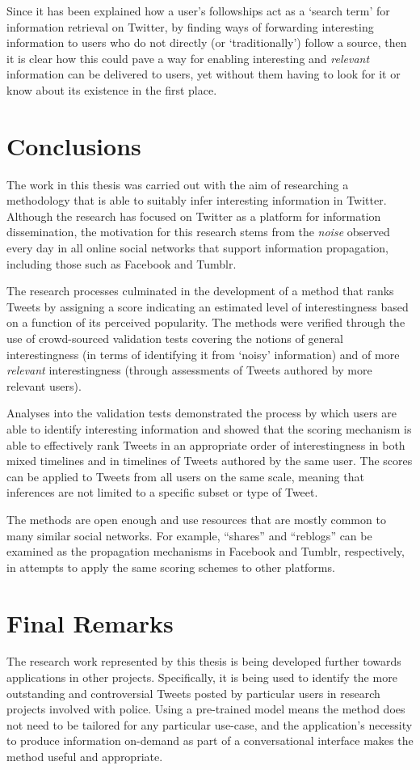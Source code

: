 Since it has been explained how a user's followships act as a `search term' for information retrieval on Twitter, by finding ways of forwarding interesting information to users who do not directly (or `traditionally') follow a source, then it is clear how this could pave a way for enabling interesting and \textit{relevant} information can be delivered to users, yet without them having to look for it or know about its existence in the first place.


\section{Conclusions}
The work in this thesis was carried out with the aim of researching a methodology that is able to suitably infer interesting information in Twitter. Although the research has focused on Twitter as a platform for information dissemination, the motivation for this research stems from the \textit{noise} observed every day in all online social networks that support information propagation, including those such as Facebook and Tumblr.

The research processes culminated in the development of a method that ranks Tweets by assigning a score indicating an estimated level of interestingness based on a function of its perceived popularity. The methods were verified through the use of crowd-sourced validation tests covering the notions of general interestingness (in terms of identifying it from `noisy' information) and of more \textit{relevant} interestingness (through assessments of Tweets authored by more relevant users).

Analyses into the validation tests demonstrated the process by which users are able to identify interesting information and showed that the scoring mechanism is able to effectively rank Tweets in an appropriate order of interestingness in both mixed timelines and in timelines of Tweets authored by the same user. The scores can be applied to Tweets from all users on the same scale, meaning that inferences are not limited to a specific subset or type of Tweet.

The methods are open enough and use resources that are mostly common to many similar social networks. For example, ``shares'' and ``reblogs'' can be examined as the propagation mechanisms in Facebook and Tumblr, respectively, in attempts to apply the same scoring schemes to other platforms.


\section{Final Remarks}
The research work represented by this thesis is being developed further towards applications in other projects. Specifically, it is being used to identify the more outstanding and controversial Tweets posted by particular users in research projects involved with police. Using a pre-trained model means the method does not need to be tailored for any particular use-case, and the application's necessity to produce information on-demand as part of a conversational interface makes the method useful and appropriate.
